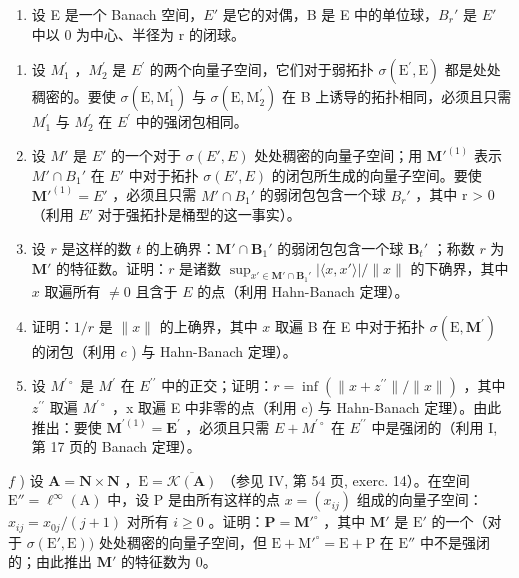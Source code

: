 \begin{enumerate}
\def\labelenumi{\arabic{enumi})}
\setcounter{enumi}{20}
\tightlist
\item
  设 E 是一个 Banach 空间，\(E'\) 是它的对偶，B 是 E 中的单位球，\(B_{r}'\) 是 \(E'\) 中以 0 为中心、半径为 r 的闭球。
\end{enumerate}

\begin{enumerate}
\def\labelenumi{\alph{enumi})}
\item
  设 \(M_{1}^{\prime}\) ，\(M_{2}^{\prime}\) 是 \(E^{\prime}\) 的两个向量子空间，它们对于弱拓扑 \(\sigma(\mathrm{E}^{\prime}, \mathrm{E})\) 都是处处稠密的。要使 \(\sigma(\mathrm{E}, \mathrm{M}_{1}^{\prime})\) 与 \(\sigma(\mathrm{E}, \mathrm{M}_{2}^{\prime})\) 在 B 上诱导的拓扑相同，必须且只需 \(M_{1}^{\prime}\) 与 \(M_{2}^{\prime}\) 在 \(E^{\prime}\) 中的强闭包相同。
\item
  设 \(M'\) 是 \(E'\) 的一个对于 \(\sigma(E', E)\) 处处稠密的向量子空间；用 \(\mathbf{M}'^{(1)}\) 表示 \(M' \cap B_{1}'\) 在 \(E'\) 中对于拓扑 \(\sigma(E', E)\) 的闭包所生成的向量子空间。要使 \(\mathbf{M}'^{(1)} = E'\) ，必须且只需 \(M' \cap B_{1}'\) 的弱闭包包含一个球 \(B_{r}'\) ，其中 r \textgreater{} 0（利用 \(E'\) 对于强拓扑是桶型的这一事实）。
\item
  设 \(r\) 是这样的数 \(t\) 的上确界：\(\mathbf{M}' \cap \mathbf{B}_1'\) 的弱闭包包含一个球 \(\mathbf{B}_t'\) ；称数 \(r\) 为 \(\mathbf{M}'\) 的特征数。证明：\(r\) 是诸数 \(\sup_{x' \in \mathbf{M}' \cap \mathbf{B}_1'} |\langle x, x' \rangle| / \| x\|\) 的下确界，其中 \(x\) 取遍所有 \(\neq 0\) 且含于 \(E\) 的点（利用 Hahn-Banach 定理）。
\item
  证明：\(1 / r\) 是 \(\| x\|\) 的上确界，其中 \(x\) 取遍 B 在 E 中对于拓扑 \(\sigma (\mathrm{E},\mathbf{M}^{\prime})\) 的闭包（利用 \(c\) ) 与 Hahn-Banach 定理）。
\item
  设 \(M^{\prime\circ}\) 是 \(M^{\prime}\) 在 \(E^{\prime\prime}\) 中的正交；证明：\(r = \inf(\|x + z^{\prime\prime}\|/\|x\|)\) ，其中 \(z^{\prime\prime}\) 取遍 \(M^{\prime\circ}\) ，x 取遍 E 中非零的点（利用 c) 与 Hahn-Banach 定理）。由此推出：要使 \(\mathbf{M}^{\prime(1)} = \mathbf{E}^{\prime}\) ，必须且只需 \(E + M^{\prime\circ}\) 在 \(E^{\prime\prime}\) 中是强闭的（利用 I, 第 17 页的 Banach 定理）。
\end{enumerate}

\(f\) ) 设 \(\mathbf{A} = \mathbf{N}\times \mathbf{N}\) ，\(\mathrm{E} = \overline{\mathcal{K}(\mathbf{A})}\) （参见 IV, 第 54 页, exerc. 14）。在空间 \(\mathrm{E}'' = \ell^{\infty}(\mathrm{A})\) 中，设 \(\mathrm{P}\) 是由所有这样的点 \(x = (x_{ij})\) 组成的向量子空间：\(x_{ij} = x_{0j} / (j + 1)\) 对所有 \(i\geqslant 0\) 。证明：\(\mathbf{P} = \mathbf{M}'^{\circ}\) ，其中 \(\mathbf{M}'\) 是 \(\mathrm{E}'\) 的一个（对于 \(\sigma (\mathrm{E}',\mathrm{E}))\) 处处稠密的向量子空间，但 \(\mathrm{E} + \mathrm{M}'^{\circ} = \mathrm{E} + \mathrm{P}\) 在 \(\mathrm{E}''\) 中不是强闭的；由此推出 \(\mathbf{M}'\) 的特征数为 0。


